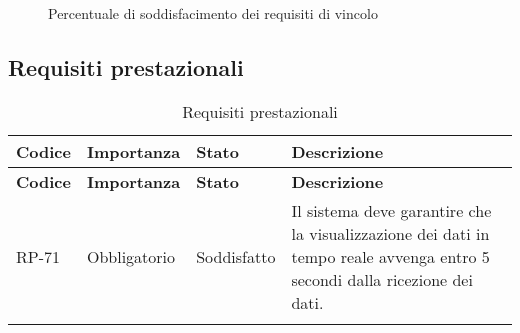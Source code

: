 \begin{figure}[!h]
	\centering
	\caption{Percentuale di soddisfacimento dei requisiti di vincolo}
\end{figure}

\newpage
\subsection{Requisiti prestazionali}
\begin{longtable}{|>{\centering\arraybackslash}m{}|>{\centering\arraybackslash}m{}|>{\centering\arraybackslash}m{}|>{\centering\arraybackslash}m{}|}
	\hline
	\textbf{Codice} & \textbf{Importanza} & \textbf{Stato}& \textbf{Descrizione}\\\hline
	\endfirsthead
	\hline
	\textbf{Codice} & \textbf{Importanza} & \textbf{Stato}& \textbf{Descrizione}\\\hline
	\endhead
	\hline
	RP-71           & Obbligatorio        & Soddisfatto       & Il sistema deve garantire che la visualizzazione dei dati in tempo reale avvenga entro 5 secondi dalla ricezione dei dati.
	\\\hline
	\caption{Requisiti prestazionali}
\end{longtable}

